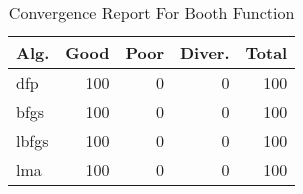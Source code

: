 \begin{table}[H]
\centering
\caption{Convergence Report For Booth Function}
\label{convergence:booth}
\begin{tabular}{lrrrr}
\toprule
 Alg. &  Good &  Poor &  Diver. &  Total \\
\midrule
  dfp &   100 &     0 &       0 &    100 \\
 bfgs &   100 &     0 &       0 &    100 \\
lbfgs &   100 &     0 &       0 &    100 \\
  lma &   100 &     0 &       0 &    100 \\
\bottomrule
\end{tabular}
\end{table}
